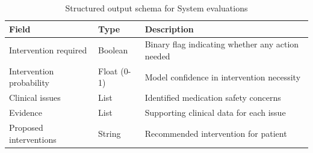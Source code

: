     \begin{table}[ht]
    
        \centering
        \begin{tabular}{@{}llp{7cm}@{}}
        \toprule
        \textbf{Field} & \textbf{Type} & \textbf{Description} \\
        \midrule
        Intervention required & Boolean & Binary flag indicating whether any action needed \\
        Intervention probability & Float (0-1) & Model confidence in intervention necessity \\
        Clinical issues & List & Identified medication safety concerns \\
        Evidence & List & Supporting clinical data for each issue \\
        Proposed interventions & String & Recommended intervention for patient \\
        \bottomrule
        \end{tabular}
        \caption{Structured output schema for System evaluations}
    \label{tab:pydantic}
    \end{table}